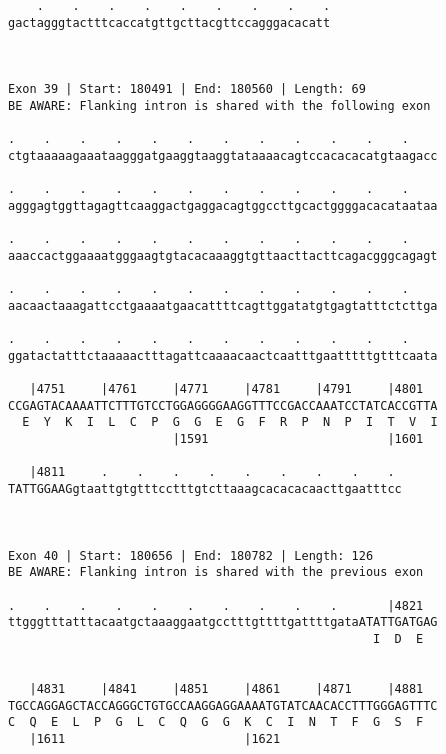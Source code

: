 \documentclass{article}
\begin{document}
\begin{Verbatim}
    .    .    .    .    .    .    .    .    .
gactagggtactttcaccatgttgcttacgttccagggacacatt
                                             
                                             
 
Exon 39 | Start: 180491 | End: 180560 | Length: 69
BE AWARE: Flanking intron is shared with the following exon
 
.    .    .    .    .    .    .    .    .    .    .    .    
ctgtaaaaagaaataagggatgaaggtaaggtataaaacagtccacacacatgtaagacc
                                                            
.    .    .    .    .    .    .    .    .    .    .    .    
agggagtggttagagttcaaggactgaggacagtggccttgcactggggacacataataa
                                                            
.    .    .    .    .    .    .    .    .    .    .    .    
aaaccactggaaaatgggaagtgtacacaaaggtgttaacttacttcagacgggcagagt
                                                            
.    .    .    .    .    .    .    .    .    .    .    .    
aacaactaaagattcctgaaaatgaacattttcagttggatatgtgagtatttctcttga
                                                            
.    .    .    .    .    .    .    .    .    .    .    .    
ggatactatttctaaaaactttagattcaaaacaactcaatttgaatttttgtttcaata
                                                            
   |4751     |4761     |4771     |4781     |4791     |4801  
CCGAGTACAAAATTCTTTGTCCTGGAGGGGAAGGTTTCCGACCAAATCCTATCACCGTTA
  E  Y  K  I  L  C  P  G  G  E  G  F  R  P  N  P  I  T  V  I
                       |1591                         |1601  
  
   |4811     .    .    .    .    .    .    .    .    . 
TATTGGAAGgtaattgtgtttcctttgtcttaaagcacacacaacttgaatttcc
                                                       
  
 
Exon 40 | Start: 180656 | End: 180782 | Length: 126
BE AWARE: Flanking intron is shared with the previous exon
 
.    .    .    .    .    .    .    .    .    .       |4821  
ttgggtttatttacaatgctaaaggaatgcctttgttttgattttgataATATTGATGAG
                                                   I  D  E  
                                                            
  
   |4831     |4841     |4851     |4861     |4871     |4881  
TGCCAGGAGCTACCAGGGCTGTGCCAAGGAGGAAAATGTATCAACACCTTTGGGAGTTTC
C  Q  E  L  P  G  L  C  Q  G  G  K  C  I  N  T  F  G  S  F  
   |1611                         |1621                      
  

\end{Verbatim}
\end{document}
